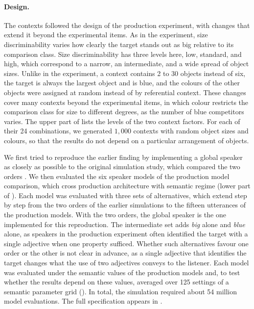 \documentclass[10pt,a4paper,fleqn]{article}
\begin{document}
\paragraph{Design.}
The contexts followed the design of the production experiment, with changes that extend it beyond the experimental items.
As in the experiment, size discriminability varies how clearly the target stands out as big relative to its comparison class.
Size discriminability has three levels here, low, standard, and high, which correspond to a narrow, an intermediate, and a wide spread of object sizes.
Unlike in the experiment, a context contains 2 to 30 objects instead of six, the target is always the largest object and is blue, and the colours of the other objects were assigned at random instead of by referential context.
These changes cover many contexts beyond the experimental items, in which colour restricts the comparison class for size to different degrees, as the number of blue competitors varies.
The upper part of  lists the levels of the two context factors.
For each of their 24 combinations, we generated $1{,}000$ contexts with random object sizes and colours, so that the results do not depend on a particular arrangement of objects.

We first tried to reproduce the earlier finding by implementing a global speaker as closely as possible to the original simulation study, which compared the two orders \citep{franke2019subjectivity}.
We then evaluated the six speaker models of the production model comparison, which cross production architecture with semantic regime (lower part of ).
Each model was evaluated with three sets of alternatives, which extend step by step from the two orders of the earlier simulations to the fifteen utterances of the production models.
With the two orders, the global speaker is the one implemented for this reproduction.
The intermediate set adds \emph{big} alone and \emph{blue} alone, as speakers in the production experiment often identified the target with a single adjective when one property sufficed.
Whether such alternatives favour one order or the other is not clear in advance, as a single adjective that identifies the target changes what the use of two adjectives conveys to the listener.
Each model was evaluated under the semantic values of the production models and, to test whether the results depend on these values, averaged over 125 settings of a semantic parameter grid ().
In total, the simulation required about 54 million model evaluations.
The full specification appears in .
\end{document}
